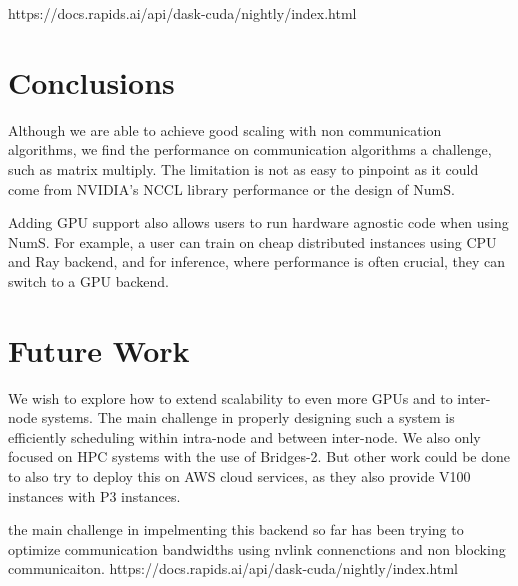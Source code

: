 \documentclass{article}
\begin{document}
https://docs.rapids.ai/api/dask-cuda/nightly/index.html

\section{Conclusions}
Although we are able to achieve good scaling with non communication algorithms, we find the performance on communication algorithms a challenge, such as matrix multiply. The limitation is not as easy to pinpoint as it could come from NVIDIA's NCCL library performance or the design of NumS. 

Adding GPU support also allows users to run hardware agnostic code when using NumS. For example, a user can train on cheap distributed instances using CPU and Ray backend, and for inference, where performance is often crucial, they can switch to a GPU backend. 

\section{Future Work}
We wish to explore how to extend scalability to even more GPUs and to inter-node systems. The main challenge in properly designing such a system is efficiently scheduling within intra-node and between inter-node. We also only focused on HPC systems with the use of Bridges-2. But other work could be done to also try to deploy this on AWS cloud services, as they also provide V100 instances with P3 instances. 


the main challenge in impelmenting this backend so far has been trying to optimize communication bandwidths using nvlink connenctions and non blocking communicaiton. 
https://docs.rapids.ai/api/dask-cuda/nightly/index.html


 
\end{document}
